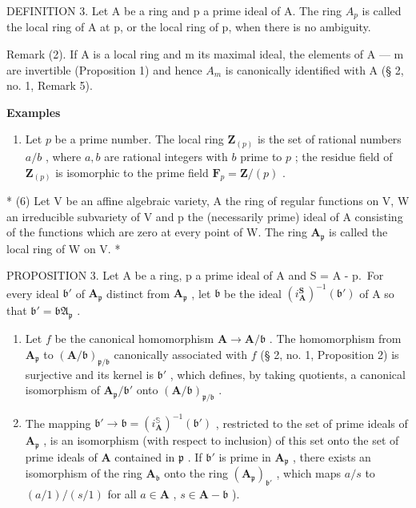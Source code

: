 DEFINITION 3. Let A be a ring and p a prime ideal of A. The ring \(A_{p}\) is called the local ring of A at p, or the local ring of p, when there is no ambiguity.

Remark (2). If A is a local ring and m its maximal ideal, the elements of A --- m are invertible (Proposition 1) and hence \(A_{m}\) is canonically identified with A (§ 2, no. 1, Remark 5).

\textbf{Examples}\par

\begin{enumerate}
\def\labelenumi{(\arabic{enumi})}
\setcounter{enumi}{4}
\tightlist
\item
  Let \(p\) be a prime number. The local ring \(\mathbf{Z}_{(p)}\) is the set of rational numbers \(a / b\) , where \(a, b\) are rational integers with \(b\) prime to \(p\) ; the residue field of \(\mathbf{Z}_{(p)}\) is isomorphic to the prime field \(\mathbf{F}_p = \mathbf{Z} / (p)\) .
\end{enumerate}

* (6) Let V be an affine algebraic variety, A the ring of regular functions on V, W an irreducible subvariety of V and p the (necessarily prime) ideal of A consisting of the functions which are zero at every point of W. The ring \(\mathbf{A}_{\mathfrak{p}}\) is called the local ring of W on V. *

PROPOSITION 3. Let A be a ring, p a prime ideal of A and S = A - p.~For every ideal \(\mathfrak{b}'\) of \(\mathbf{A}_{\mathfrak{p}}\) distinct from \(\mathbf{A}_{\mathfrak{p}}\) , let \(\mathfrak{b}\) be the ideal \((i_{\mathbf{A}}^{\mathbf{S}})^{-1}(\mathfrak{b}')\) of A so that \(\mathfrak{b}' = \mathfrak{bA}_{\mathfrak{p}}\) .

\begin{enumerate}
\def\labelenumi{(\roman{enumi})}
\item
  Let \(f\) be the canonical homomorphism \(\mathbf{A} \to \mathbf{A} / \mathfrak{b}\) . The homomorphism from \(\mathbf{A}_{\mathfrak{p}}\) to \((\mathbf{A} / \mathfrak{b})_{\mathfrak{p} / \mathfrak{b}}\) canonically associated with \(f\) (§ 2, no. 1, Proposition 2) is surjective and its kernel is \(\mathfrak{b}'\) , which defines, by taking quotients, a canonical isomorphism of \(\mathbf{A}_{\mathfrak{p}} / \mathfrak{b}'\) onto \((\mathbf{A} / \mathfrak{b})_{\mathfrak{p} / \mathfrak{b}}\) .
\item
  The mapping \(\mathfrak{b}' \to \mathfrak{b} = (i_{\mathbf{A}}^{\mathbb{S}})^{-1}(\mathfrak{b}')\) , restricted to the set of prime ideals of \(\mathbf{A}_{\mathfrak{p}}\) , is an isomorphism (with respect to inclusion) of this set onto the set of prime ideals of \(\mathbf{A}\) contained in \(\mathfrak{p}\) . If \(\mathfrak{b}'\) is prime in \(\mathbf{A}_{\mathfrak{p}}\) , there exists an isomorphism of the ring \(\mathbf{A}_{\mathfrak{b}}\) onto the ring \((\mathbf{A}_{\mathfrak{p}})_{\mathfrak{b}'}\) , which maps \(a / s\) to \((a / 1) / (s / 1)\) for all \(a \in \mathbf{A}\) , \(s \in \mathbf{A} - \mathfrak{b}\) ).
\end{enumerate}

